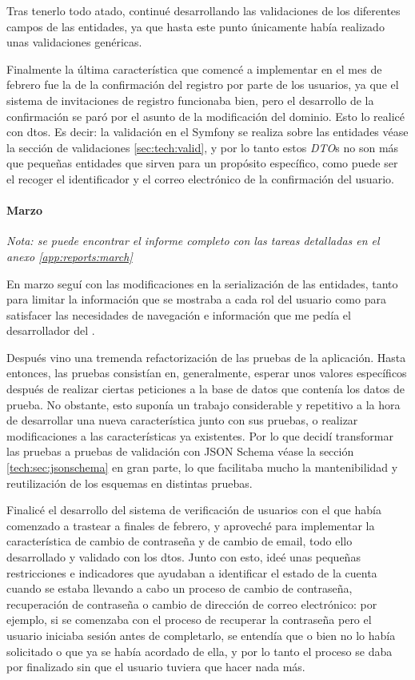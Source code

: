 Tras tenerlo todo atado, continué desarrollando las validaciones de los diferentes campos
de las entidades, ya que hasta este punto únicamente había realizado unas validaciones
genéricas.

Finalmente la última característica que comencé a implementar en el mes de febrero fue la de la
confirmación del registro por parte de los usuarios, ya que el sistema de invitaciones
de registro funcionaba bien, pero el desarrollo de la confirmación se paró por el asunto
de la modificación del dominio. Esto lo realicé con \gls{dto}s.
Es decir: la validación en el  Symfony se realiza
sobre las entidades \textemdash véase la sección de validaciones \ref{sec:tech:valid}\textemdash,
y por lo tanto estos \textit{DTO}s no son más que pequeñas entidades que sirven para un
propósito específico, como puede ser el recoger el identificador y el correo electrónico
de la confirmación del usuario.

\paragraph{Marzo}
\textit{Nota: se puede encontrar el informe completo con las tareas detalladas
en el anexo \ref{app:reports:march}}

En marzo seguí con las modificaciones en la serialización de las entidades, tanto para
limitar la información que se mostraba a cada rol del usuario como para satisfacer las
necesidades de navegación e información que me pedía el desarrollador del .

Después vino una tremenda refactorización de las pruebas de la aplicación. Hasta entonces,
las pruebas consistían en, generalmente, esperar unos valores específicos después de
realizar ciertas peticiones a la base de datos que contenía los datos de prueba. No obstante,
esto suponía un trabajo considerable y repetitivo a la hora de desarrollar una nueva
característica junto con sus pruebas, o realizar modificaciones a las características ya existentes. Por
lo que decidí transformar las pruebas a pruebas de validación con JSON Schema \textemdash véase la sección  \ref{tech:sec:jsonschema} \textemdash
en gran parte, lo que facilitaba mucho la mantenibilidad y reutilización de los esquemas en distintas pruebas.

Finalicé el desarrollo del sistema de verificación de usuarios con el que había comenzado
a trastear a finales de febrero, y aproveché para implementar la característica de cambio
de contraseña y de cambio de email, todo ello desarrollado y validado con los \gls{dto}s.
Junto con esto, ideé unas pequeñas restricciones
e indicadores que ayudaban a identificar el estado de la cuenta cuando se estaba llevando
a cabo un proceso de cambio de contraseña, recuperación de contraseña o cambio de dirección de correo electrónico: por ejemplo, si se comenzaba
con el proceso de recuperar la contraseña pero el usuario iniciaba sesión antes de completarlo,
se entendía que o bien no lo había solicitado o que ya se había acordado de ella, y por lo tanto
el proceso se daba por finalizado sin que el usuario tuviera que hacer nada más.

